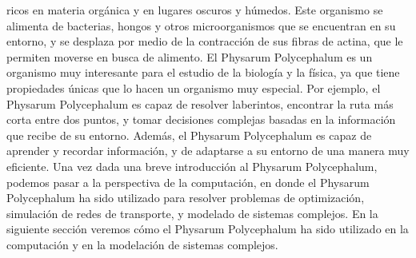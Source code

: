         ricos en materia org\'anica y en lugares oscuros y h\'umedos. Este organismo se alimenta de bacterias, 
        hongos y otros microorganismos que se encuentran en su entorno, y se desplaza por medio de la contracci\'on 
        de sus fibras de actina, que le permiten moverse en busca de alimento.\cite{Dee1960}
    \vskip 0.5cm
    El Physarum Polycephalum es un organismo muy interesante para el estudio de la biolog\'ia y la f\'isica, 
        ya que tiene propiedades \'unicas que lo hacen un organismo muy especial. Por ejemplo, el Physarum Polycephalum 
        es capaz de resolver laberintos, encontrar la ruta m\'as corta entre dos puntos, y tomar decisiones complejas 
        basadas en la informaci\'on que recibe de su entorno. Adem\'as, el Physarum Polycephalum es capaz de aprender 
        y recordar informaci\'on, y de adaptarse a su entorno de una manera muy eficiente.
    \vskip 0.5cm
    Una vez dada una breve introducci\'on al Physarum Polycephalum, podemos pasar a la perspectiva de la computaci\'on, 
        en donde el Physarum Polycephalum ha sido utilizado para resolver problemas de optimizaci\'on, simulaci\'on 
        de redes de transporte, y modelado de sistemas complejos. En la siguiente secci\'on veremos c\'omo el Physarum 
        Polycephalum ha sido utilizado en la computaci\'on y en la modelaci\'on de sistemas complejos.
    